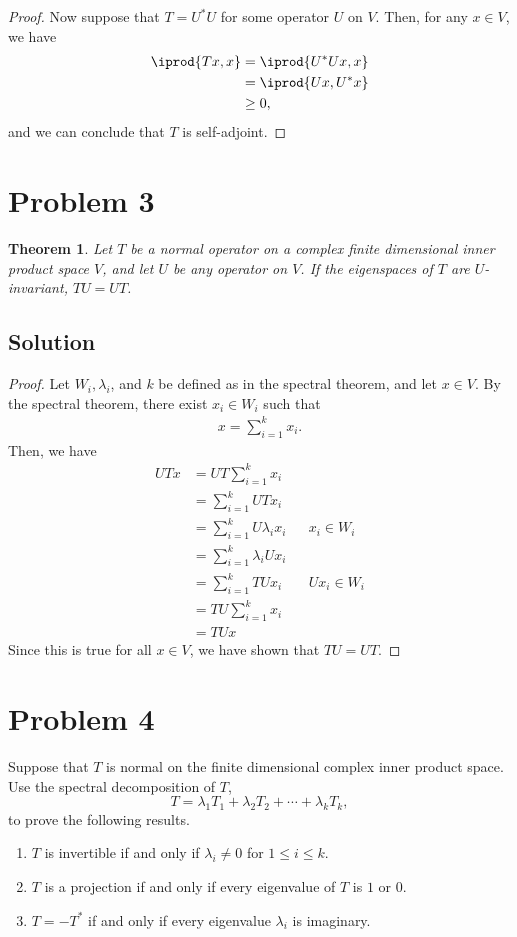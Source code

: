 \documentclass[10pt,a4paper]{article}
\newtheorem{theorem}{Theorem}
\theoremstyle{definition}
\begin{document}
\begin{proof}
Now suppose that $T = U^* U$ for some operator $U$ on $V$. Then, for any $x \in V$, we have
\begin{align*}
\iprod{Tx, x} &= \iprod{U^*U x, x}\\
&= \iprod{U x, U^* x}\\
&\geq 0,
\end{align*}
and we can conclude that $T$ is self-adjoint.
\end{proof}

\section*{Problem 3}
\begin{theorem}
Let $T$ be a normal operator on a complex finite dimensional inner product space $V$, and let $U$ be any operator on $V$. If the
eigenspaces of $T$ are $U$-invariant, $TU = UT$.
\end{theorem}

\subsection*{Solution}
\begin{proof}
Let $W_i, \lambda_i$, and $k$ be defined as in the spectral theorem, and let $x \in V$. By the spectral theorem, there exist $x_i \in W_i$ such that
\begin{align*}
x = \sum_{i=1}^k x_i.
\end{align*}
Then, we have 
\begin{align*}
UTx &= UT \sum_{i=1}^k x_i\\
&= \sum_{i=1}^k UTx_i\\
&= \sum_{i=1}^k U \lambda_i x_i &&x_i \in W_i\\
&= \sum_{i=1}^k \lambda_i U x_i\\
&= \sum_{i=1}^k TUx_i && Ux_i \in W_i\\
&= TU \sum_{i=1}^k x_i\\
&= TUx
\end{align*}
Since this is true for all $x \in V$, we have shown that $TU = UT$.
\end{proof}

\section*{Problem 4}
Suppose that $T$ is normal on the finite dimensional complex inner product
space. Use the spectral decomposition of $T$,
\[T = \lambda_1 T_1 + \lambda_2 T_2 + \cdots + \lambda_k T_k,\]
to prove the following results.
\begin{enumerate}
\item $T$ is invertible if and only if $\lambda_i \neq 0$ for $1 \leq i \leq
k$.
\item $T$ is a projection if and only if every eigenvalue of $T$ is $1$ or $0$.
\item $T = - T^*$ if and only if every eigenvalue $\lambda_i$ is imaginary.
\end{enumerate}
\end{document}

